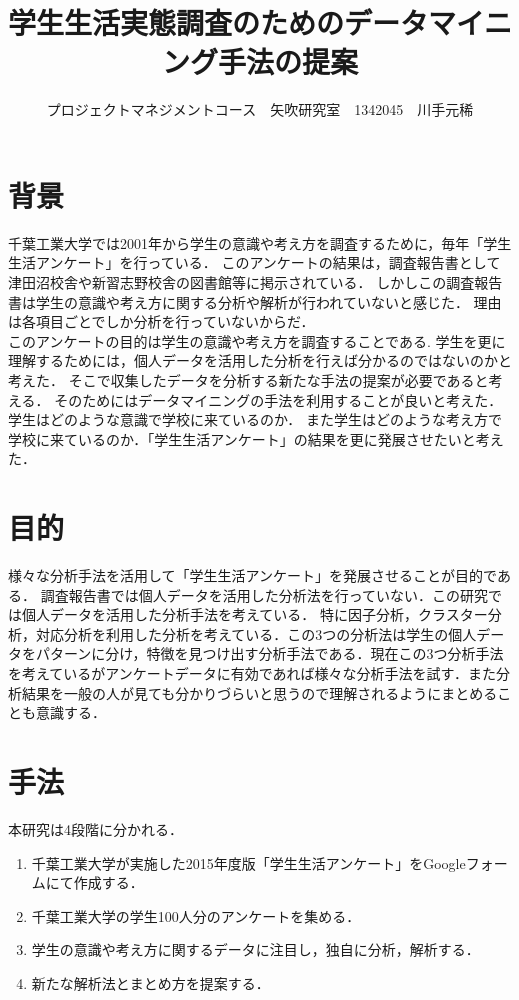\documentclass[uplatex,twocolumn,dvipdfmx]{jsarticle}
\title{\vspace{-5mm}\fontsize{14pt}{0pt}\selectfont 学生生活実態調査のためのデータマイニング手法の提案}
\author{\normalsize プロジェクトマネジメントコース　矢吹研究室　1342045　川手元稀}
\date{}
\begin{document}
\fontsize{10.5pt}{\baselineskip}\selectfont
\maketitle





\section{背景}
千葉工業大学では2001年から学生の意識や考え方を調査するために，毎年「学生生活アンケート」を行っている．
このアンケートの結果は，調査報告書として津田沼校舎や新習志野校舎の図書館等に掲示されている．
しかしこの調査報告書は学生の意識や考え方に関する分析や解析が行われていないと感じた．
理由は各項目ごとでしか分析を行っていないからだ．
\\このアンケートの目的は学生の意識や考え方を調査することである\cite{a}.
学生を更に理解するためには，個人データを活用した分析を行えば分かるのではないのかと考えた．
そこで収集したデータを分析する新たな手法の提案が必要であると考える．
そのためにはデータマイニングの手法を利用することが良いと考えた．学生はどのような意識で学校に来ているのか．
また学生はどのような考え方で学校に来ているのか．「学生生活アンケート」の結果を更に発展させたいと考えた．


\section{目的}
様々な分析手法を活用して「学生生活アンケート」を発展させることが目的である．
調査報告書では個人データを活用した分析法を行っていない．この研究では個人データを活用した分析手法を考えている．
特に因子分析，クラスター分析，対応分析を利用した分析を考えている．この3つの分析法は学生の個人データをパターンに分け，特徴を見つけ出す分析手法である\cite{b}．現在この3つ分析手法を考えているがアンケートデータに有効であれば様々な分析手法を試す．また分析結果を一般の人が見ても分かりづらいと思うので理解されるようにまとめることも意識する．


\section{手法}
本研究は4段階に分かれる．

\begin{enumerate}
\item 千葉工業大学が実施した2015年度版「学生生活アンケート」をGoogleフォームにて作成する．
\item 千葉工業大学の学生100人分のアンケートを集める．
\item 学生の意識や考え方に関するデータに注目し，独自に分析，解析する．
\item 新たな解析法とまとめ方を提案する．
\end{enumerate}
\end{document}
